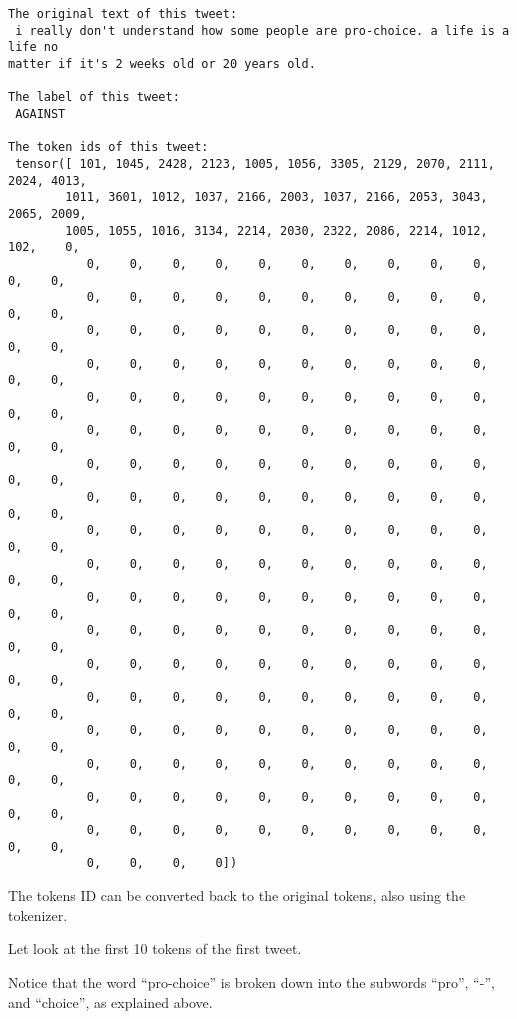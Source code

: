\documentclass[11pt]{article}
\begin{document}
    \begin{Verbatim}[commandchars=\\\{\}]
The original text of this tweet:
 i really don't understand how some people are pro-choice. a life is a life no
matter if it's 2 weeks old or 20 years old.

The label of this tweet:
 AGAINST

The token ids of this tweet:
 tensor([ 101, 1045, 2428, 2123, 1005, 1056, 3305, 2129, 2070, 2111, 2024, 4013,
        1011, 3601, 1012, 1037, 2166, 2003, 1037, 2166, 2053, 3043, 2065, 2009,
        1005, 1055, 1016, 3134, 2214, 2030, 2322, 2086, 2214, 1012,  102,    0,
           0,    0,    0,    0,    0,    0,    0,    0,    0,    0,    0,    0,
           0,    0,    0,    0,    0,    0,    0,    0,    0,    0,    0,    0,
           0,    0,    0,    0,    0,    0,    0,    0,    0,    0,    0,    0,
           0,    0,    0,    0,    0,    0,    0,    0,    0,    0,    0,    0,
           0,    0,    0,    0,    0,    0,    0,    0,    0,    0,    0,    0,
           0,    0,    0,    0,    0,    0,    0,    0,    0,    0,    0,    0,
           0,    0,    0,    0,    0,    0,    0,    0,    0,    0,    0,    0,
           0,    0,    0,    0,    0,    0,    0,    0,    0,    0,    0,    0,
           0,    0,    0,    0,    0,    0,    0,    0,    0,    0,    0,    0,
           0,    0,    0,    0,    0,    0,    0,    0,    0,    0,    0,    0,
           0,    0,    0,    0,    0,    0,    0,    0,    0,    0,    0,    0,
           0,    0,    0,    0,    0,    0,    0,    0,    0,    0,    0,    0,
           0,    0,    0,    0,    0,    0,    0,    0,    0,    0,    0,    0,
           0,    0,    0,    0,    0,    0,    0,    0,    0,    0,    0,    0,
           0,    0,    0,    0,    0,    0,    0,    0,    0,    0,    0,    0,
           0,    0,    0,    0,    0,    0,    0,    0,    0,    0,    0,    0,
           0,    0,    0,    0,    0,    0,    0,    0,    0,    0,    0,    0,
           0,    0,    0,    0,    0,    0,    0,    0,    0,    0,    0,    0,
           0,    0,    0,    0])

    \end{Verbatim}

    The tokens ID can be converted back to the original tokens, also using
the tokenizer.

    Let look at the first 10 tokens of the first tweet.

Notice that the word ``pro-choice'' is broken down into the subwords
``pro'', ``-'', and ``choice'', as explained above.
\end{document}
